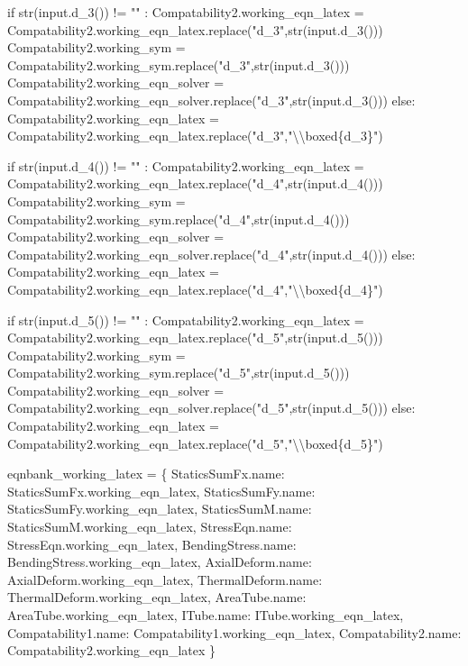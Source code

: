 \documentclass[
  letterpaper,
  DIV=11,
  numbers=noendperiod]{scrreprt}
\newenvironment{Shaded}{\begin{snugshade}}{\end{snugshade}}
\newcommand{\NormalTok}[1]{\textcolor[rgb]{0.00,0.23,0.31}{#1}}
\begin{document}
\begin{Shaded}
\begin{Highlighting}[]
\NormalTok{            if str(input.d\_3()) != "" : }
\NormalTok{                Compatability2.working\_eqn\_latex = Compatability2.working\_eqn\_latex.replace("d\_3",str(input.d\_3()))}
\NormalTok{                Compatability2.working\_sym = Compatability2.working\_sym.replace("d\_3",str(input.d\_3()))}
\NormalTok{                Compatability2.working\_eqn\_solver = Compatability2.working\_eqn\_solver.replace("d\_3",str(input.d\_3()))}
\NormalTok{            else:}
\NormalTok{                Compatability2.working\_eqn\_latex = Compatability2.working\_eqn\_latex.replace("d\_3","\textbackslash{}\textbackslash{}boxed\{d\_3\}")}
            
\NormalTok{            if str(input.d\_4()) != "" : }
\NormalTok{                Compatability2.working\_eqn\_latex = Compatability2.working\_eqn\_latex.replace("d\_4",str(input.d\_4()))}
\NormalTok{                Compatability2.working\_sym = Compatability2.working\_sym.replace("d\_4",str(input.d\_4()))}
\NormalTok{                Compatability2.working\_eqn\_solver = Compatability2.working\_eqn\_solver.replace("d\_4",str(input.d\_4()))}
\NormalTok{            else:}
\NormalTok{                Compatability2.working\_eqn\_latex = Compatability2.working\_eqn\_latex.replace("d\_4","\textbackslash{}\textbackslash{}boxed\{d\_4\}")}
            
\NormalTok{            if str(input.d\_5()) != "" : }
\NormalTok{                Compatability2.working\_eqn\_latex = Compatability2.working\_eqn\_latex.replace("d\_5",str(input.d\_5()))}
\NormalTok{                Compatability2.working\_sym = Compatability2.working\_sym.replace("d\_5",str(input.d\_5()))}
\NormalTok{                Compatability2.working\_eqn\_solver = Compatability2.working\_eqn\_solver.replace("d\_5",str(input.d\_5()))}
\NormalTok{            else:}
\NormalTok{                Compatability2.working\_eqn\_latex = Compatability2.working\_eqn\_latex.replace("d\_5","\textbackslash{}\textbackslash{}boxed\{d\_5\}")}
                
                
\NormalTok{        eqnbank\_working\_latex = \{}
\NormalTok{        StaticsSumFx.name: StaticsSumFx.working\_eqn\_latex,}
\NormalTok{        StaticsSumFy.name: StaticsSumFy.working\_eqn\_latex,}
\NormalTok{        StaticsSumM.name: StaticsSumM.working\_eqn\_latex,}
\NormalTok{        StressEqn.name: StressEqn.working\_eqn\_latex,}
\NormalTok{        BendingStress.name: BendingStress.working\_eqn\_latex,}
\NormalTok{        AxialDeform.name: AxialDeform.working\_eqn\_latex,}
\NormalTok{        ThermalDeform.name: ThermalDeform.working\_eqn\_latex,}
\NormalTok{        AreaTube.name: AreaTube.working\_eqn\_latex,}
\NormalTok{        ITube.name: ITube.working\_eqn\_latex,}
\NormalTok{        Compatability1.name: Compatability1.working\_eqn\_latex,}
\NormalTok{        Compatability2.name: Compatability2.working\_eqn\_latex}
\NormalTok{        \}}


\end{Highlighting}
\end{Shaded}
\end{document}
